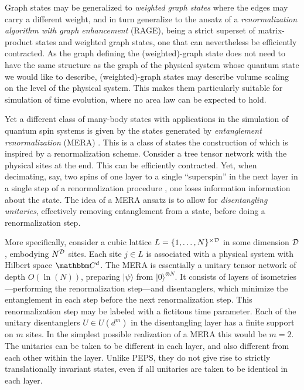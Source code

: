 \documentclass[rmp,twocolumn,floatfix,epsfig,graphics]{revtex4} %
\begin{document}
Graph states may be generalized to {\it weighted graph states} 
\cite{Weighted,GraphsLong,PlenioJMO} where the edges may carry a 
different weight, and in turn generalize to the ansatz of a
{\it renormalization algorithm with graph enhancement} (RAGE),\cite{Rage} 
being a strict superset of matrix-product states 
and weighted graph states, one that can nevertheless be efficiently 
contracted. As the graph defining the (weighted)-graph state does
not need to have the same structure as the graph of the physical
system whose quantum state we would like to describe, (weighted)-graph 
states may describe volume scaling on the level of the physical
system. This makes them particularly suitable for simulation of time 
evolution, where no area law can be expected to hold. 

Yet a different class of many-body states with applications in the simulation of 
quantum spin systems is given by the states  generated by {\it entanglement 
renormalization} (MERA) \cite{MERA1}. 
This is a class of states the construction of which is
inspired by a renormalization scheme. Consider a 
tree tensor network with
the physical sites at the end. This can be efficiently contracted. Yet, when decimating, say,
two spins of one layer to a single ``superspin'' in the next layer in a single step of a 
renormalization procedure , one loses information information about the state. The idea
of a MERA ansatz is to allow for {\it disentangling unitaries}, effectively removing
entanglement from a state, before doing a renormalization step.  

More specifically, consider a cubic lattice $L=\{1,\dots, N\}^{\times {\cal D}}$
in some dimension ${\cal D}$, embodying $N^{\cal D}$ sites. Each 
site $j\in L$ is associated with a physical system with Hilbert 
space $\cc^d$. The MERA is essentially a unitary tensor network of depth
$O(\ln(N))$, preparing $|\psi\rangle$ from $|0\rangle^{\otimes N}$. 
It consists of layers of isometries ---performing the renormalization 
step---and disentanglers, which minimize the entanglement in each 
step before the next renormalization step. This renormalization 
step may be labeled with a fictitous time parameter. Each of the 
unitary disentanglers  $U\in U(d^m)$ in the disentangling layer
has a finite support on $m$ sites. In the simplest possible 
realization of a MERA this would be $m=2$. The unitaries can be 
taken to be different in each layer, and also different from each 
other within the layer. Unlike PEPS, they do not give rise to 
strictly translationally invariant states, even if all unitaries 
are taken to be identical in each layer. 
 
\end{document}
